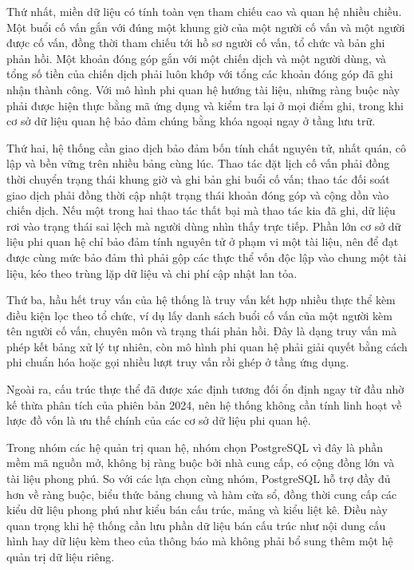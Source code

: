 \documentclass[12pt,a4paper,oneside]{report}
\begin{document}
Thứ nhất, miền dữ liệu có tính toàn vẹn tham chiếu cao và quan hệ nhiều chiều. Một buổi cố vấn gắn với đúng một khung giờ của một người cố vấn và một người được cố vấn, đồng thời tham chiếu tới hồ sơ người cố vấn, tổ chức và bản ghi phản hồi. Một khoản đóng góp gắn với một chiến dịch và một người dùng, và tổng số tiền của chiến dịch phải luôn khớp với tổng các khoản đóng góp đã ghi nhận thành công. Với mô hình phi quan hệ hướng tài liệu, những ràng buộc này phải được hiện thực bằng mã ứng dụng và kiểm tra lại ở mọi điểm ghi, trong khi cơ sở dữ liệu quan hệ bảo đảm chúng bằng khóa ngoại ngay ở tầng lưu trữ.

Thứ hai, hệ thống cần giao dịch bảo đảm bốn tính chất nguyên tử, nhất quán, cô lập và bền vững trên nhiều bảng cùng lúc. Thao tác đặt lịch cố vấn phải đồng thời chuyển trạng thái khung giờ và ghi bản ghi buổi cố vấn; thao tác đối soát giao dịch phải đồng thời cập nhật trạng thái khoản đóng góp và cộng dồn vào chiến dịch. Nếu một trong hai thao tác thất bại mà thao tác kia đã ghi, dữ liệu rơi vào trạng thái sai lệch mà người dùng nhìn thấy trực tiếp. Phần lớn cơ sở dữ liệu phi quan hệ chỉ bảo đảm tính nguyên tử ở phạm vi một tài liệu, nên để đạt được cùng mức bảo đảm thì phải gộp các thực thể vốn độc lập vào chung một tài liệu, kéo theo trùng lặp dữ liệu và chi phí cập nhật lan tỏa.

Thứ ba, hầu hết truy vấn của hệ thống là truy vấn kết hợp nhiều thực thể kèm điều kiện lọc theo tổ chức, ví dụ lấy danh sách buổi cố vấn của một người kèm tên người cố vấn, chuyên môn và trạng thái phản hồi. Đây là dạng truy vấn mà phép kết bảng xử lý tự nhiên, còn mô hình phi quan hệ phải giải quyết bằng cách phi chuẩn hóa hoặc gọi nhiều lượt truy vấn rồi ghép ở tầng ứng dụng.

Ngoài ra, cấu trúc thực thể đã được xác định tương đối ổn định ngay từ đầu nhờ kế thừa phân tích của phiên bản 2024, nên hệ thống không cần tính linh hoạt về lược đồ vốn là ưu thế chính của các cơ sở dữ liệu phi quan hệ.

Trong nhóm các hệ quản trị quan hệ, nhóm chọn PostgreSQL vì đây là phần mềm mã nguồn mở, không bị ràng buộc bởi nhà cung cấp, có cộng đồng lớn và tài liệu phong phú. So với các lựa chọn cùng nhóm, PostgreSQL hỗ trợ đầy đủ hơn về ràng buộc, biểu thức bảng chung và hàm cửa sổ, đồng thời cung cấp các kiểu dữ liệu phong phú như kiểu bán cấu trúc, mảng và kiểu liệt kê. Điều này quan trọng khi hệ thống cần lưu phần dữ liệu bán cấu trúc như nội dung cấu hình hay dữ liệu kèm theo của thông báo mà không phải bổ sung thêm một hệ quản trị dữ liệu riêng.
\end{document}
